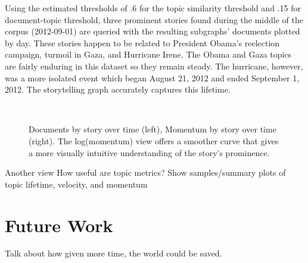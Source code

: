\documentclass[10pt]{article}
\begin{document}
Using the estimated thresholds of .6 for the topic similarity threshold and .15 for document-topic threshold, three prominent stories found during the middle of the corpus (2012-09-01) are queried with the resulting subgraphs' documents plotted by day.  These stories happen to be related to President Obama's reelection campaign, turmoil in Gaza, and Hurricane Irene.  The Obama and Gaza topics are fairly enduring in this dataset so they remain steady.  The hurricane, however, was a more isolated event which began August 21, 2012 and ended September 1, 2012.  The storytelling graph accurately captures this lifetime. 

\begin{figure}
\centering
\mbox{
}
\caption{Documents by story over time (left), Momentum by story over time (right).  The log(momentum) view offers a smoother curve that gives a more visually intuitive understanding of the story's prominence. }
\end{figure}

Another view 
How useful are topic metrics? Show samples/summary plots of topic lifetime, velocity, and momentum

\section {Future Work}

Talk about how given more time, the world could be saved.
\end{document}
